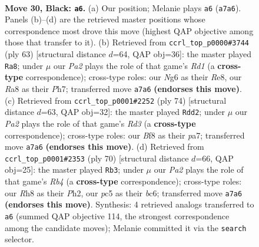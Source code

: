 \documentclass[11pt]{article}
\begin{document}
\clearpage

\begin{figure}[p]\centering
\begin{subfigure}{0.46\textwidth}\centering
\resizebox{\linewidth}{!}{%
\newchessgame
\chessboard[
  setfen={rk3b1r/p7/4BPn1/2P1p2p/1P2R3/8/8/R1B1K3 b Q - 2 30},
  showmover=false,
  pgfstyle=straightmove, color=movearrow, markmove={a7-a6}
]}
\caption{}
\end{subfigure}\hfill
\begin{subfigure}{0.46\textwidth}\centering
\resizebox{\linewidth}{!}{%
\newchessgame
\chessboard[
  setfen={3rr2b/7p/4k3/R3Pp2/p2p1B1P/3R4/P5P1/6K1 b - - 6 32},
  showmover=false,
  pgfstyle=straightmove, color=movearrow, markmove={d8-a8}
]}
\caption{}
\end{subfigure}
\\[4pt]
\begin{subfigure}{0.46\textwidth}\centering
\resizebox{\linewidth}{!}{%
\newchessgame
\chessboard[
  setfen={8/p3kp2/8/8/1Pr4b/P2RPr2/6R1/3N2K1 w - - 3 38},
  showmover=false,
  pgfstyle=straightmove, color=movearrow, markmove={d3-d2}
]}
\caption{}
\end{subfigure}\hfill
\begin{subfigure}{0.46\textwidth}\centering
\resizebox{\linewidth}{!}{%
\newchessgame
\chessboard[
  setfen={2kr4/2p3p1/2b2p2/2P5/1R1Pr3/5N2/1P3K1P/5R2 w - - 7 36},
  showmover=false,
  pgfstyle=straightmove, color=movearrow, markmove={b4-b3}
]}
\caption{}
\end{subfigure}
\caption{\textbf{Move 30, Black: \texttt{a6}.} (a) Our position; Melanie plays \texttt{a6} (\texttt{a7a6}). Panels (b)--(d) are the retrieved master positions whose correspondence most drove this move (highest QAP objective among those that transfer to it). (b) Retrieved from \texttt{ccrl\_top\_p0000\#3744} (ply 63) [structural distance $d$=64, QAP obj=36]: the master played \texttt{Ra8}; under $\mu$ our \emph{Pa2} plays the role of that game's \emph{Rd1} (a \textbf{cross-type} correspondence); cross-type roles: our \emph{N}g6 as their \emph{R}e8, our \emph{R}a8 as their \emph{P}h7; transferred move \texttt{a7a6} \textbf{(endorses this move)}. (c) Retrieved from \texttt{ccrl\_top\_p0001\#2252} (ply 74) [structural distance $d$=63, QAP obj=32]: the master played \texttt{Rdd2}; under $\mu$ our \emph{Pa2} plays the role of that game's \emph{Rd3} (a \textbf{cross-type} correspondence); cross-type roles: our \emph{B}f8 as their \emph{p}a7; transferred move \texttt{a7a6} \textbf{(endorses this move)}. (d) Retrieved from \texttt{ccrl\_top\_p0001\#2353} (ply 70) [structural distance $d$=66, QAP obj=25]: the master played \texttt{Rb3}; under $\mu$ our \emph{Pa2} plays the role of that game's \emph{Rb4} (a \textbf{cross-type} correspondence); cross-type roles: our \emph{R}h8 as their \emph{P}h2, our \emph{p}c5 as their \emph{b}c6; transferred move \texttt{a7a6} \textbf{(endorses this move)}. Synthesis: 4 retrieved analogs transferred to \texttt{a6} (summed QAP objective 114, the strongest correspondence among the candidate moves); Melanie committed it via the \texttt{search} selector.}
\label{fig:thought-m59}
\end{figure}
\end{document}
